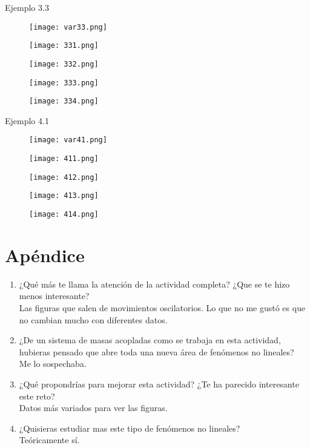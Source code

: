 \documentclass{article}
\begin{document}
Ejemplo 3.3
\begin{figure}[H]
\texttt{[image: var33.png]}
\end{figure}
\begin{figure}[H]
\texttt{[image: 331.png]}
\end{figure}
\begin{figure}[H]
\texttt{[image: 332.png]}
\end{figure}
\begin{figure}[H]
\texttt{[image: 333.png]}
\end{figure}
\begin{figure}[H]
\texttt{[image: 334.png]}
\end{figure}
Ejemplo 4.1
\begin{figure}[H]
\texttt{[image: var41.png]}
\end{figure}
\begin{figure}[H]
\texttt{[image: 411.png]}
\end{figure}
\begin{figure}[H]
\texttt{[image: 412.png]}
\end{figure}
\begin{figure}[H]
\texttt{[image: 413.png]}
\end{figure}
\begin{figure}[H]
\texttt{[image: 414.png]}
\end{figure}
\section{Apéndice}
\begin{enumerate}
\item ¿Qué más te llama la atención de la actividad completa? ¿Que se te hizo menos interesante?
\\Las figuras que salen de movimientos oscilatorios. Lo que no me gustó es que no cambian mucho con diferentes datos.
\item ¿De un sistema de masas acopladas como se trabaja en esta actividad, hubieras pensado que abre toda una nueva área de fenómenos no lineales?
\\Me lo sospechaba.
\item ¿Qué propondrías para mejorar esta actividad? ¿Te ha parecido interesante este reto?
\\Datos más variados para ver las figuras.
\item ¿Quisieras estudiar mas este tipo de fenómenos no lineales?
\\Teóricamente sí.
\end{enumerate}
\end{document}
